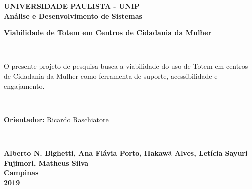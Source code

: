 \thispagestyle{empty}
\begin{center}
\normalsize{\textbf{UNIVERSIDADE PAULISTA - UNIP}}\\[0.3pc]
\normalsize{\textbf{Análise e Desenvolvimento de Sistemas}}\\[8pc]
\parbox{10cm}{\begin{center}\normalsize{\textbf{Viabilidade de Totem em Centros de Cidadania da Mulher}}\end{center}}\\
\end{center}
\par
\vspace{30pt}
\hspace*{130pt}\parbox{10cm}{{\normalsize O presente projeto de pesquisa busca a viabilidade do uso de Totem em centros de Cidadania da Mulher como ferramenta de suporte, acessibilidade e engajamento.}}\\[1pc]

\noindent\hspace*{165pt}\parbox{10cm}{{\normalsize \textbf{Orientador:} Ricardo Raschiatore}}\\[1pc]
\begin{center}
\vspace{50pt}
\normalsize{\textbf{Alberto N. Bighetti, Ana Flávia Porto, Hakawã Alves, Letícia Sayuri Fujimori, Matheus Silva}}\\[1pc]%
\vfill
\normalsize{\textbf{Campinas}}\\[1pc]
\normalsize{\textbf{2019}}
\end{center}
\newpage 